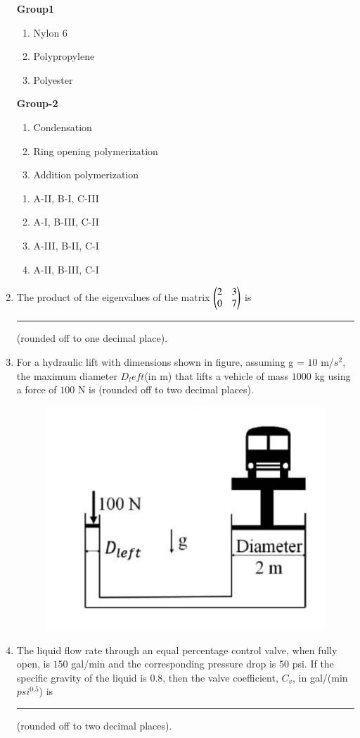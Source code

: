 \documentclass[journal,12pt,onecolumn]{IEEEtran}
\theoremstyle{remark}
\begin{document}
\begin{enumerate}
\begin{multicols}{2}
    \textbf{Group1}
    \begin{enumerate}[label=(\Alph*)]
        \item Nylon 6
        \item Polypropylene
        \item Polyester
    \end{enumerate}
\columnbreak

    \textbf{Group-2}
    \begin{enumerate}[label=(\Roman*)]
        \item Condensation
        \item Ring opening polymerization
        \item Addition polymerization
    \end{enumerate}
\end{multicols}
\begin{multicols}{2}
    \begin{enumerate}
        \item A-II, B-I, C-III
        \item A-I, B-III, C-II
        \item A-III, B-II, C-I
        \item A-II, B-III, C-I
    \end{enumerate}
\end{multicols}

    \item 
        The product of the eigenvalues of the matrix  $\begin{pmatrix}
            2 & 3 \\
            0 & 7
        \end{pmatrix}$ is \rule{2cm}{0.1mm} (rounded off to one decimal place).
     
\newpage
    \item For a hydraulic lift with dimensions shown in figure, assuming g = $10$ m/$s^2$, the maximum diameter $D_left$(in m) that lifts a vehicle of mass $1000$ kg using a force of $100$ N is (rounded off to two decimal places).

    \begin{figure}[H]
        \centering
        \includegraphics[width=0.4\columnwidth]{Fig/23.png}
        \caption*{}
        \label{fig: 23}
    \end{figure}
\item The liquid flow rate through an equal percentage control valve, when fully open, is $150$ gal/min and the corresponding pressure drop is $50$ psi. If the specific gravity of the liquid is $0.8$, then the valve coefficient, $C_v$, in gal/(min $psi^{0.5}$) is  \rule{1cm}{0.1mm} (rounded off to two decimal places).


\end{enumerate}
\end{document}
